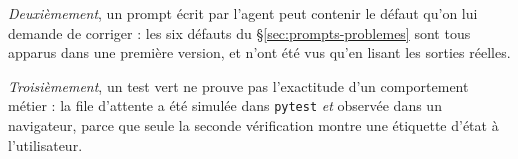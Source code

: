 \emph{Deuxièmement}, un prompt écrit par l'agent peut contenir le défaut qu'on
lui demande de corriger : les six défauts du §\ref{sec:prompts-problemes} sont
tous apparus dans une première version, et n'ont été vus qu'en lisant les sorties
réelles.

\emph{Troisièmement}, un test vert ne prouve pas l'exactitude d'un comportement
métier : la file d'attente a été simulée dans \texttt{pytest} \emph{et} observée
dans un navigateur, parce que seule la seconde vérification montre une étiquette
d'état à l'utilisateur.
